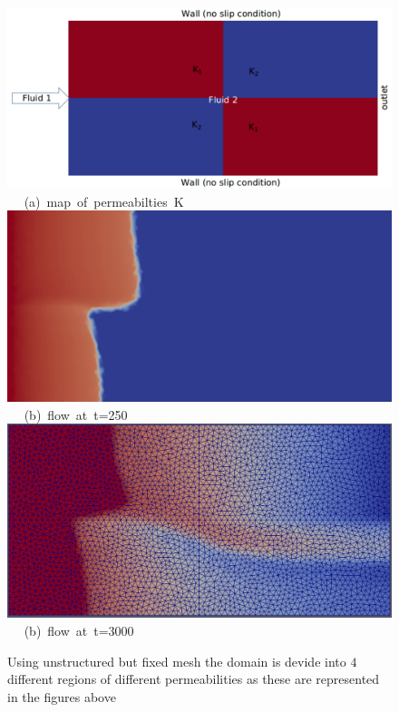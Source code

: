 \begin{figure}[ht] 
\vbox{
\hbox{\hspace{1.5cm}
\includegraphics[width=.75\textwidth]{./Pics1/2b2_wi_fine/2b2_whole_in_fine_perm_1.pdf} 
}
\vspace{0.0cm}
\hbox{\hspace{5.0cm} (a) map of permeabilties K  
}
\vspace{0.25cm}
\hbox{\hspace{1.5cm}
\includegraphics[width=.75\textwidth]{./Pics1/2b2_wi_fine/2b2_whole_in_fine_250_2.pdf}
}
\vspace{0.0cm}
\hbox{\hspace{5.0cm} (b) flow at t=250  
}
\vspace{0.25cm}
\hbox{\hspace{1.5cm}
\includegraphics[width=.75\textwidth]{./Pics1/2b2_wi_fine/2b2_whole_in_fine_3000_1.pdf}
}
\vspace{0.0cm}
\hbox{\hspace{5.0cm} (b) flow at t=3000  
}
}     
\caption{Using unstructured but fixed mesh the domain is devide into $4$ different regions of different permeabilities as these are represented in the figures above}
\label{fem_cv_represent_a}
\end{figure}



